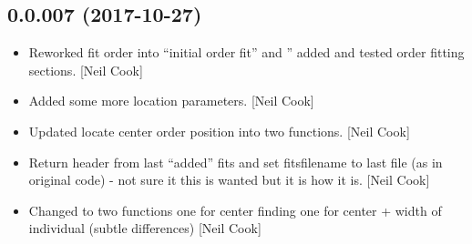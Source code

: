 \documentclass[a4paper,10pt,english]{report}
\begin{document}
\subsection{0.0.007 (2017-10-27)}
\label{\detokenize{misc/changelog:id544}}\begin{itemize}
\item {} 
Reworked fit order into “initial order fit” and ”
added and tested order fitting sections. {[}Neil Cook{]}

\item {} 
Added some more location parameters. {[}Neil Cook{]}

\item {} 
Updated locate center order position into two functions. {[}Neil Cook{]}

\item {} 
Return header from last “added” fits and set fitsfilename to last file
(as in original code) - not sure it this is wanted but it is how it
is. {[}Neil Cook{]}

\item {} 
Changed  to two functions one for center
finding one for center + width of individual (subtle differences)
{[}Neil Cook{]}

\end{itemize}
\end{document}
